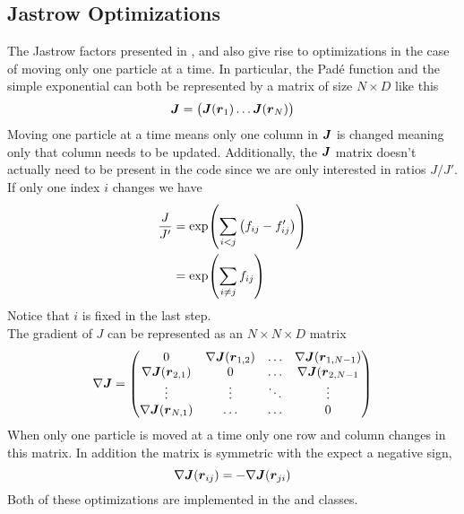 \subsection{Jastrow Optimizations}
    The Jastrow factors presented in ,
     and  also give rise to
    optimizations in the case of moving only one particle at a time. In
    particular, the Pad\'e function and the simple exponential can both be
    represented by a matrix of size $N\times D$ like this
        \begin{equation}
            \blds{J} = 
                \begin{pmatrix}
                    \blds{J}(\blds{r}_1) \dots \blds{J}(\blds{r}_N)
                \end{pmatrix}
        \end{equation}
    Moving one particle at a time means only one column in $\boldsymbol{{J}}$ is
    changed meaning only that column needs to be updated. Additionally, the
    $\boldsymbol{{J}}$ matrix doesn't actually need to be present in the code since we
    are only interested in ratios $J/J'$. If only one index $i$ changes we have
        \begin{align}
            \frac{J}{J'} &= \exp(\sum\limits_{i<j} \left(f_{ij} - f'_{ij}\right))
            \nonumber \\
            &= \exp(\sum\limits_{i\neq j} f_{ij})
        \end{align}
    Notice that $i$ is fixed in the last step. \\
    The gradient of $J$ can be represented as an $N\times N\times D$ matrix
        \begin{equation}
            \nabla \boldsymbol{{J}} = 
                \begin{pmatrix}
                    0 & \nabla \boldsymbol{{J}}(\boldsymbol{{r}}_{1,2}) & \dots & \nabla
                    \boldsymbol{{J}}(\boldsymbol{{r}}_{1,N-1}) \\
                    \nabla \boldsymbol{{J}}(\boldsymbol{{r}}_{2,1}) & 0 & \dots & \nabla
                    \boldsymbol{{J}}(\boldsymbol{{r}}_{2,N-1} \\
                    \vdots & \vdots & \ddots & \vdots \\
                    \nabla \boldsymbol{{J}}(\boldsymbol{{r}}_{N,1}) & \dots & \dots & 0 
                \end{pmatrix}
        \end{equation}
    When only one particle is moved at a time only one row and column changes
    in this matrix. In addition the matrix is symmetric with the expect a
    negative sign,
        \begin{equation}
            \nabla \boldsymbol{{J}}(\boldsymbol{{r}}_{ij}) = -\nabla\boldsymbol{{J}}(\boldsymbol{{r}}_{ji})
        \end{equation}
    Both of these optimizations are implemented in the 
    and  classes. \\ 

